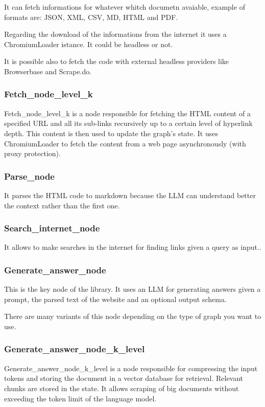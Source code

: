 It can fetch informations for whatever whitch documetn avaiable, example of formats are: JSON, XML, CSV, MD, HTML and PDF.

Regarding the download of the informations from the internet it uses a ChromiumLoader istance. It could be headless or not.

It is possible  also to fetch the code with external headless providers like Browserbase and Scrape.do.

\subsubsection{Fetch\_node\_level\_k}
Fetch\_node\_level\_k is a node responsible for fetching the HTML content of a specified URL and all its sub-links recursively up to a certain level of hyperlink depth. This content is then used to update the graph's state. It uses ChromiumLoader to fetch the content from a web page asynchronously (with proxy protection).

\subsubsection{Parse\_node}
It parses the HTML code to markdown because the LLM can understand better the context rather than the first one.

\subsubsection{Search\_internet\_node}
It allows to make searches in the internet for finding links given a query as input..

\subsubsection{Generate\_answer\_node}
This is the key node of the library. It uses an LLM for generating answers given a prompt, the parsed text of the website and an optional output schema.

There are many variants of this node depending on the type of graph you want to use.

\subsubsection{Generate\_answer\_node\_k\_level}
Generate\_answer\_node\_k\_level is a node responsible for compressing the input tokens and storing the document in a vector database for retrieval. Relevant chunks are stored in the state. It allows scraping of big documents without exceeding the token limit of the language model.

